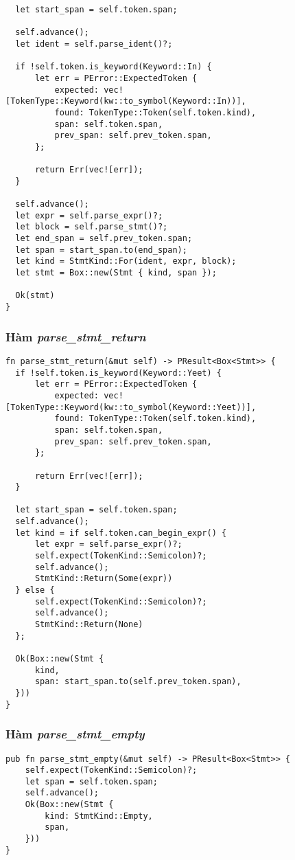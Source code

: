 {\begin{lstlisting}
  let start_span = self.token.span;

  self.advance();
  let ident = self.parse_ident()?;

  if !self.token.is_keyword(Keyword::In) {
      let err = PError::ExpectedToken {
          expected: vec![TokenType::Keyword(kw::to_symbol(Keyword::In))],
          found: TokenType::Token(self.token.kind),
          span: self.token.span,
          prev_span: self.prev_token.span,
      };

      return Err(vec![err]);
  }

  self.advance();
  let expr = self.parse_expr()?;
  let block = self.parse_stmt()?;
  let end_span = self.prev_token.span;
  let span = start_span.to(end_span);
  let kind = StmtKind::For(ident, expr, block);
  let stmt = Box::new(Stmt { kind, span });

  Ok(stmt)
}
\end{lstlisting}

\subsubsection{Hàm \textit{parse\_stmt\_return}}
\label{ap1:stmt_yeet}
\begin{lstlisting}
fn parse_stmt_return(&mut self) -> PResult<Box<Stmt>> {
  if !self.token.is_keyword(Keyword::Yeet) {
      let err = PError::ExpectedToken {
          expected: vec![TokenType::Keyword(kw::to_symbol(Keyword::Yeet))],
          found: TokenType::Token(self.token.kind),
          span: self.token.span,
          prev_span: self.prev_token.span,
      };

      return Err(vec![err]);
  }

  let start_span = self.token.span;
  self.advance();
  let kind = if self.token.can_begin_expr() {
      let expr = self.parse_expr()?;
      self.expect(TokenKind::Semicolon)?;
      self.advance();
      StmtKind::Return(Some(expr))
  } else {
      self.expect(TokenKind::Semicolon)?;
      self.advance();
      StmtKind::Return(None)
  };

  Ok(Box::new(Stmt {
      kind,
      span: start_span.to(self.prev_token.span),
  }))
}
\end{lstlisting}

\subsubsection{Hàm \textit{parse\_stmt\_empty}}
\label{ap1:stmt_semicolon}
\begin{lstlisting}
pub fn parse_stmt_empty(&mut self) -> PResult<Box<Stmt>> {
    self.expect(TokenKind::Semicolon)?;
    let span = self.token.span;
    self.advance();
    Ok(Box::new(Stmt {
        kind: StmtKind::Empty,
        span,
    }))
}
\end{lstlisting}

}
